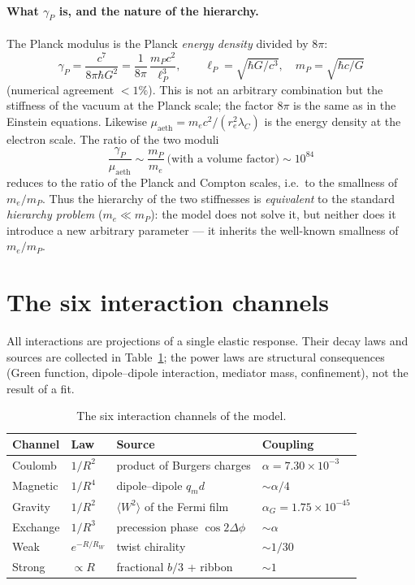\documentclass[12pt,a4paper]{article}
\begin{document}
\paragraph{What $\gamma_P$ is, and the nature of the hierarchy.}
The Planck modulus is the Planck \emph{energy density} divided by $8\pi$:
\begin{equation}
\gamma_P=\frac{c^7}{8\pi\hbar G^2}=\frac{1}{8\pi}\,\frac{m_P c^2}{\ell_P^3},
\qquad \ell_P=\sqrt{\hbar G/c^3},\quad m_P=\sqrt{\hbar c/G}
\end{equation}
(numerical agreement $<1\%$). This is not an arbitrary combination but the
stiffness of the vacuum at the Planck scale; the factor $8\pi$ is the same as
in the Einstein equations. Likewise $\mu_{\text{aeth}}=m_e c^2/(r_e^2\lambda_C)$
is the energy density at the electron scale. The ratio of the two moduli
\begin{equation}
\frac{\gamma_P}{\mu_{\text{aeth}}}\sim\frac{m_P}{m_e}\ \text{(with a volume factor)}\sim10^{84}
\end{equation}
reduces to the ratio of the Planck and Compton scales, i.e.\ to the smallness
of $m_e/m_P$. Thus the hierarchy of the two stiffnesses is \emph{equivalent} to
the standard \emph{hierarchy problem} ($m_e\ll m_P$): the model does not solve
it, but neither does it introduce a new arbitrary parameter --- it inherits the
well-known smallness of $m_e/m_P$.

\section{The six interaction channels}
\label{sec:channels}
All interactions are projections of a single elastic response. Their decay laws
and sources are collected in Table~\ref{tab:channels}; the power laws are
structural consequences (Green function, dipole--dipole interaction, mediator
mass, confinement), not the result of a fit.

\begin{table}[h]
\centering
\caption{The six interaction channels of the model.}
\label{tab:channels}
\begin{tabular}{llll}
\toprule
Channel & Law & Source & Coupling \\
\midrule
Coulomb & $1/R^2$ & product of Burgers charges & $\alpha=7.30\times10^{-3}$ \\
Magnetic & $1/R^4$ & dipole--dipole $q_m d$ & $\sim\alpha/4$ \\
Gravity & $1/R^2$ & $\langle W^2\rangle$ of the Fermi film & $\alpha_G=1.75\times10^{-45}$ \\
Exchange & $1/R^3$ & precession phase $\cos2\Delta\phi$ & $\sim\alpha$ \\
Weak & $e^{-R/R_W}$ & twist chirality & $\sim 1/30$ \\
Strong & $\propto R$ & fractional $b/3$ + ribbon & $\sim 1$ \\
\bottomrule
\end{tabular}
\end{table}
\end{document}

